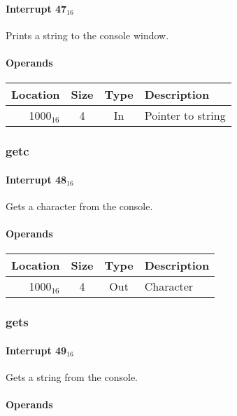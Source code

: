 \documentclass{article}
\begin{document}
\paragraph{Interrupt 47$_{16}$}

Prints a string to the console window.

\paragraph{Operands}

\begin{tabular}{|r|c|c|l|}
	\hline
	\textbf{Location} & \textbf{Size} & \textbf{Type} & \textbf{Description} \\
	\hline
	1000$_{16}$ & 4 & In & Pointer to string \\
	\hline
\end{tabular}

\subsubsection{getc}

\paragraph{Interrupt 48$_{16}$}

Gets a character from the console.

\paragraph{Operands}

\begin{tabular}{|r|c|c|l|}
	\hline
	\textbf{Location} & \textbf{Size} & \textbf{Type} & \textbf{Description} \\
	\hline
	1000$_{16}$ & 4 & Out & Character \\
	\hline
\end{tabular}

\subsubsection{gets}

\paragraph{Interrupt 49$_{16}$}

Gets a string from the console.

\paragraph{Operands}
\end{document}

